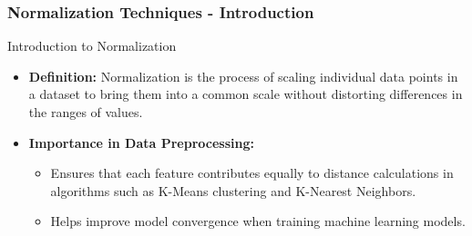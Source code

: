 \documentclass[aspectratio=169]{beamer}
\begin{document}
\begin{frame}[fragile]
    \frametitle{Normalization Techniques - Introduction}
    \begin{block}{Introduction to Normalization}
        \begin{itemize}
            \item \textbf{Definition:} Normalization is the process of scaling individual data points in a dataset to bring them into a common scale without distorting differences in the ranges of values.
            \item \textbf{Importance in Data Preprocessing:}
            \begin{itemize}
                \item Ensures that each feature contributes equally to distance calculations in algorithms such as K-Means clustering and K-Nearest Neighbors.
                \item Helps improve model convergence when training machine learning models.
            \end{itemize}
        \end{itemize}
    \end{block}
\end{frame}
\end{document}
